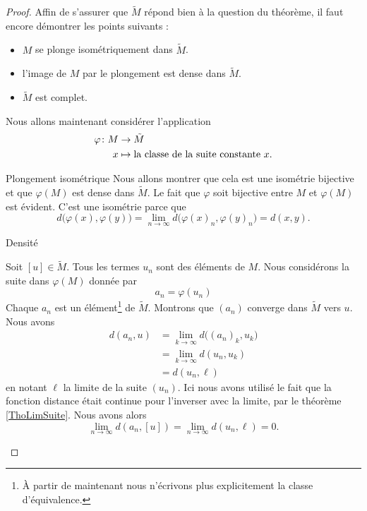\begin{proof}
    Affin de s'assurer que \( \tilde M\) répond bien à la question du théorème, il faut encore démontrer les points suivants :
    \begin{itemize}
        \item \( M\) se plonge isométriquement dans \( \tilde M\).
        \item l'image de \( M\) par le plongement est dense dans \( \tilde M\).
        \item \( \tilde M\) est complet.
    \end{itemize}

    Nous allons maintenant considérer l'application
    \begin{equation}
        \begin{aligned}
            \varphi\colon M&\to \tilde M \\
            x&\mapsto \text{la classe de la suite constante \( x\).} 
        \end{aligned}
    \end{equation}
    \begin{subproof}
        \item[Plongement isométrique]
        Nous allons montrer que cela est une isométrie bijective et que \( \varphi(M)\) est dense dans \( \tilde M\). Le fait que \( \varphi\) soit bijective entre \( M\) et \( \varphi(M)\) est évident. C'est une isométrie parce que
        \begin{equation}
            d\big( \varphi(x),\varphi(y) \big)=\lim_{n\to \infty} d\big(\varphi(x)_n,\varphi(y)_n\big)=d(x,y).
        \end{equation}
        
    \item[Densité]

        Soit \( [u]\in \tilde M\). Tous les termes \( u_n\) sont des éléments de \( M\). Nous considérons la suite dans \( \varphi(M)\) donnée par
        \begin{equation}
            a_n=\varphi(u_n)
        \end{equation}
        Chaque \( a_n\) est un élément\footnote{À partir de maintenant nous n'écrivons plus explicitement la classe d'équivalence.} de \( \tilde M\). Montrons que \( (a_n)\) converge dans \( \tilde M\) vers \( u\). Nous avons
        \begin{subequations}
            \begin{align}
                d(a_n,u)&=\lim_{k\to \infty} d\big( (a_n)_k,u_k \big)\\
                &=\lim_{k\to \infty} d(u_n,u_k)\\
                &=d(u_n,\ell)
            \end{align}
        \end{subequations}
        en notant \( \ell\) la limite de la suite \( (u_n)\). Ici nous avons utilisé le fait que la fonction distance était continue pour l'inverser avec la limite, par le théorème \ref{ThoLimSuite}. Nous avons alors
        \begin{equation}
            \lim_{n\to \infty} d(a_n,[u])=\lim_{n\to \infty} d(u_n,\ell)=0.
        \end{equation}
        

\end{subproof}
\end{proof}
